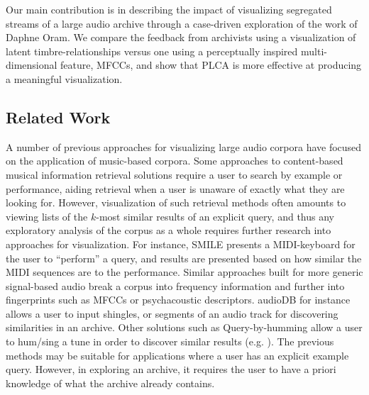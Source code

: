 \documentclass[a4paper,10pt,final]{ThesisStyle}
\begin{document}
Our main contribution is in describing the impact of visualizing segregated streams of a large audio archive through a case-driven exploration of the work of Daphne Oram.  We compare the feedback from archivists using a visualization of latent timbre-relationships versus one using a perceptually inspired multi-dimensional feature, MFCCs, and show that PLCA is more effective at producing a meaningful visualization.  


\subsection{Related Work}

A number of previous approaches for visualizing large audio corpora have focused on the application of music-based corpora.  Some approaches to content-based musical information retrieval solutions require a user to search by example or performance, aiding retrieval when a user is unaware of exactly what they are looking for.  However, visualization of such retrieval methods often amounts to viewing lists of the $k$-most similar results of an explicit query, and thus any exploratory analysis of the corpus as a whole requires further research into approaches for visualization.  For instance, SMILE \cite{Melucci2000} presents a MIDI-keyboard for the user to ``perform'' a query, and results are presented based on how similar the MIDI sequences are to the performance.  Similar approaches built for more generic signal-based audio break a corpus into frequency information and further into fingerprints such as MFCCs or psychacoustic descriptors.  audioDB \cite{Casey2008c,Rhodes2010} for instance allows a user to input shingles, or segments of an audio track for discovering similarities in an archive.  Other solutions such as Query-by-humming allow a user to hum/sing a tune in order to discover similar results (e.g. \cite{Wang2006a,Cartwright}).  The previous methods may be suitable for applications where a user has an explicit example query.  However, in exploring an archive, it requires the user to have a priori knowledge of what the archive already contains.
\end{document}
